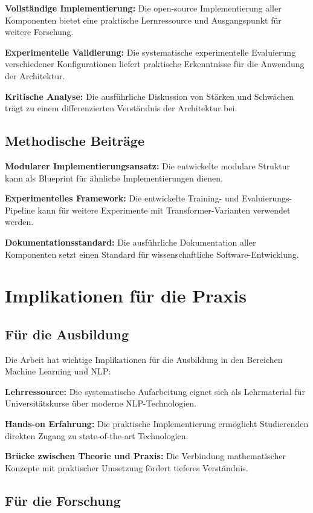 \textbf{Vollständige Implementierung:} Die open-source Implementierung aller Komponenten bietet eine praktische Lernressource und Ausgangspunkt für weitere Forschung.

\textbf{Experimentelle Validierung:} Die systematische experimentelle Evaluierung verschiedener Konfigurationen liefert praktische Erkenntnisse für die Anwendung der Architektur.

\textbf{Kritische Analyse:} Die ausführliche Diskussion von Stärken und Schwächen trägt zu einem differenzierten Verständnis der Architektur bei.

\subsection{Methodische Beiträge}

\textbf{Modularer Implementierungsansatz:} Die entwickelte modulare Struktur kann als Blueprint für ähnliche Implementierungen dienen.

\textbf{Experimentelles Framework:} Die entwickelte Training- und Evaluierungs-Pipeline kann für weitere Experimente mit Transformer-Varianten verwendet werden.

\textbf{Dokumentationsstandard:} Die ausführliche Dokumentation aller Komponenten setzt einen Standard für wissenschaftliche Software-Entwicklung.

\section{Implikationen für die Praxis}

\subsection{Für die Ausbildung}

Die Arbeit hat wichtige Implikationen für die Ausbildung in den Bereichen Machine Learning und NLP:

\textbf{Lehrressource:} Die systematische Aufarbeitung eignet sich als Lehrmaterial für Universitätskurse über moderne NLP-Technologien.

\textbf{Hands-on Erfahrung:} Die praktische Implementierung ermöglicht Studierenden direkten Zugang zu state-of-the-art Technologien.

\textbf{Brücke zwischen Theorie und Praxis:} Die Verbindung mathematischer Konzepte mit praktischer Umsetzung fördert tieferes Verständnis.

\subsection{Für die Forschung}


